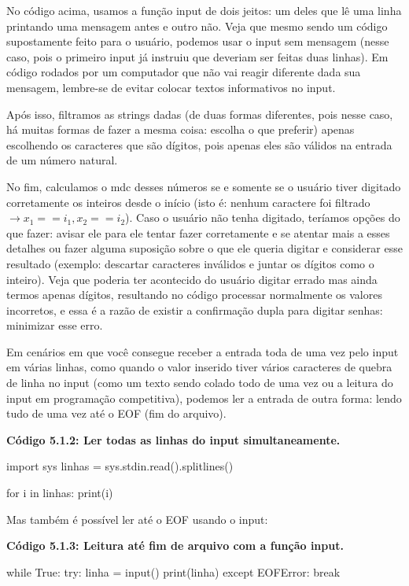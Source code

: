 \documentclass[11pt, a4paper]{article}
\begin{document}
No código acima, usamos a função input de dois jeitos: um deles que lê uma linha printando uma mensagem antes e outro não. Veja que mesmo sendo um código supostamente feito para o usuário, podemos usar o input sem mensagem (nesse caso, pois o primeiro input já instruiu que deveriam ser feitas duas linhas). Em código rodados por um computador que não vai reagir diferente dada sua mensagem, lembre-se de evitar colocar textos informativos no input.

Após isso, filtramos as strings dadas (de duas formas diferentes, pois nesse caso, há muitas formas de fazer a mesma coisa: escolha o que preferir) apenas escolhendo os caracteres que são dígitos, pois apenas eles são válidos na entrada de um número natural.

No fim, calculamos o mdc desses números se e somente se o usuário tiver digitado corretamente os inteiros desde o início (isto é: nenhum caractere foi filtrado \(\rightarrow x_1 == i_1, x_2==i_2\)). Caso o usuário não tenha digitado, teríamos opções do que fazer: avisar ele para ele tentar fazer corretamente e se atentar mais a esses detalhes ou fazer alguma suposição sobre o que ele queria digitar e considerar esse resultado (exemplo: descartar caracteres inválidos e juntar os dígitos como o inteiro). Veja que poderia ter acontecido do usuário digitar errado mas ainda termos apenas dígitos, resultando no código processar normalmente os valores incorretos, e essa é a razão de existir a confirmação dupla para digitar senhas: minimizar esse erro.

Em cenários em que você consegue receber a entrada toda de uma vez pelo input em várias linhas, como quando o valor inserido tiver vários caracteres de quebra de linha no input (como um texto sendo colado todo de uma vez ou a leitura do input em programação competitiva), podemos ler a entrada de outra forma: lendo tudo de uma vez até o EOF (fim do arquivo).

\textbf{Código 5.1.2: Ler todas as linhas do input simultaneamente.}

\begin{code}
import sys
linhas = sys.stdin.read().splitlines()

for i in linhas:
    print(i)
\end{code}

Mas também é possível ler até o EOF usando o input:

\textbf{Código 5.1.3: Leitura até fim de arquivo com a função input.}

\begin{code}
while True:
    try:
        linha = input()
        print(linha)
    except EOFError:
        break
\end{code}
\end{document}
